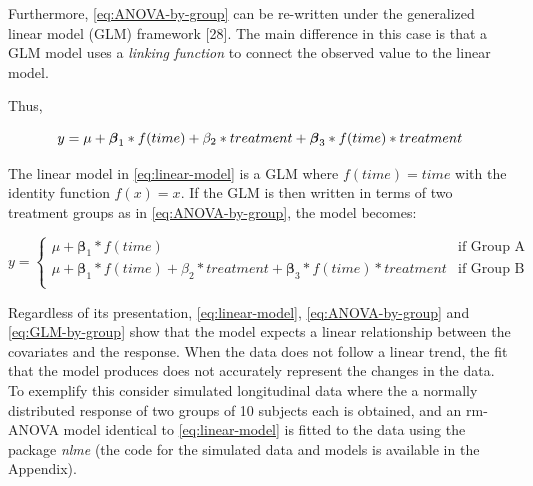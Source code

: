 \documentclass[
]{article}
\begin{document}
Furthermore, \eqref{eq:ANOVA-by-group} can be re-written under the generalized linear model (GLM) framework {[}28{]}. The main difference in this case is that a GLM model uses a \emph{linking function} to connect the observed value to the linear model.

Thus,

\begin{equation}
  y =\mu +\boldsymbol{\beta}_1* f(time) + \beta_2* treatment+ \\
  \boldsymbol{\beta}_3* f(time)*treatment \\
  \label{eq:GLM}
  \end{equation}

The linear model in \eqref{eq:linear-model} is a GLM where \(f(time) = time\) with the identity function \(f(x) = x\). If the GLM is then written in terms of two treatment groups as in \eqref{eq:ANOVA-by-group}, the model becomes:

\begin{equation}
  y = \begin{cases}
  \mu +\boldsymbol{\beta}_1* f(time)  & \mbox{if Group A} \\
  \mu +\boldsymbol{\beta}_1* f(time)  + \beta_2* treatment + \boldsymbol{\beta}_3* f(time) *treatment   
  & \mbox{if Group B}\\
  \end{cases}
  \label{eq:GLM-by-group}
\end{equation}

Regardless of its presentation, \eqref{eq:linear-model}, \eqref{eq:ANOVA-by-group} and \eqref{eq:GLM-by-group} show that the model expects a linear relationship between the covariates and the response. When the data does not follow a linear trend, the fit that the model produces does not accurately represent the changes in the data. To exemplify this consider simulated longitudinal data where the a normally distributed response of two groups of 10 subjects each is obtained, and an rm-ANOVA model identical to \eqref{eq:linear-model} is fitted to the data using the package \emph{nlme} (the code for the simulated data and models is available in the Appendix).
\end{document}
